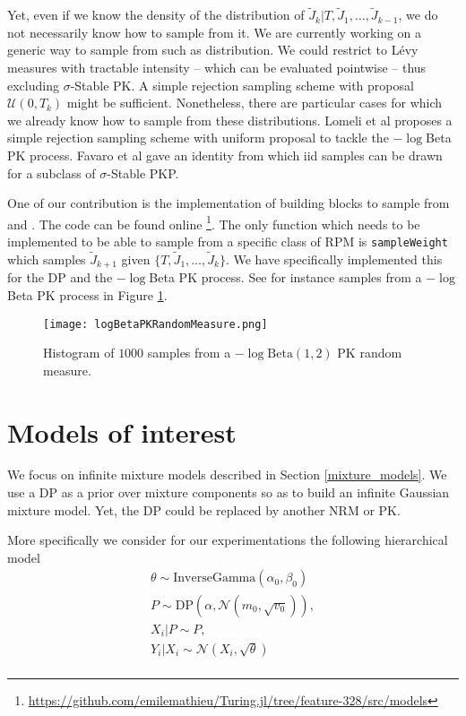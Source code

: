 Yet, even if we know the density of the distribution of $\tilde{J}_{k}|T,\tilde{J}_1,\dots,\tilde{J}_{k-1}$, we do not necessarily know how to sample from it.
We are currently working on a generic way to sample from such as distribution. We could restrict to Lévy measures with tractable intensity -- which can be evaluated pointwise -- thus excluding $\sigma$-Stable \gls{PK}. A simple rejection sampling scheme with proposal $\mathcal{U}(0, T_k)$ might be sufficient.
Nonetheless, there are particular cases for which we already know how to sample from these distributions. Lomeli et al \cite{Lomeli:2015vd} proposes a simple rejection sampling scheme with uniform proposal to tackle the $-\log$Beta \gls{PK} process. Favaro et al \cite{Favaro:2014bo} gave an identity from which iid samples can be drawn for a subclass of $\sigma$-Stable \gls{PKP}.

One of our contribution is the implementation of building blocks to sample from  and . The code can be found online \footnote{\url{https://github.com/emilemathieu/Turing.jl/tree/feature-328/src/models}}. The only function which needs to be implemented to be able to sample from a specific class of \acrlong{RPM} is \texttt{sampleWeight} which samples $\tilde{J}_{k+1}$ given $\{T,\tilde{J}_{1},\dots,\tilde{J}_{k}\}$. We have specifically implemented this for the \gls{DP} and the $-\log$Beta \gls{PK} process. See for instance samples from a $-\log$Beta \gls{PK} process in Figure \ref{fig:logBetaPK}.

\begin{figure}[h!]
\centering
    \texttt{[image: logBetaPKRandomMeasure.png]} 
    \caption{Histogram of $1000$ samples from a $-\log \text{Beta}(1,2)$ \acrlong{PK} random measure.}
    \label{fig:logBetaPK} 
\end{figure}

\section{Models of interest}
We focus on infinite mixture models described in Section \ref{mixture_models}.
We use a \acrlong{DP} as a prior over mixture components so as to build an infinite Gaussian mixture model.
Yet, the \gls{DP} could be replaced by another \acrlong{NRM} or \acrlong{PK}.

More specifically we consider for our experimentations the following hierarchical model
\begin{gather*}
\theta \sim \text{InverseGamma}(\alpha_0, \beta_0) \\
P \sim \text{DP}(\alpha, \mathcal{N}(m_0, \sqrt{v_0})), \\
X_i|P \sim P, \\
Y_i|X_i \sim \mathcal{N}(X_i, \sqrt{\theta}) \\
\end{gather*}

